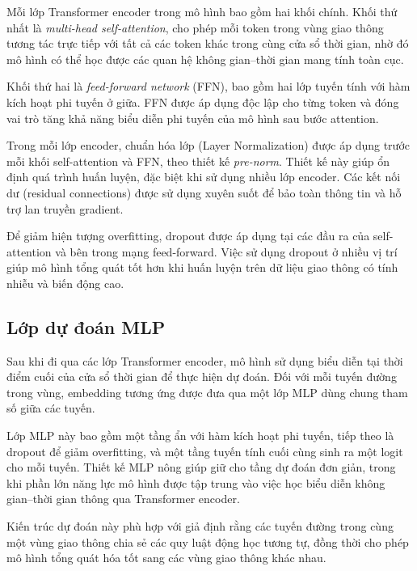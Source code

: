 Mỗi lớp Transformer encoder trong mô hình bao gồm hai khối chính. Khối thứ nhất là
\textit{multi-head self-attention}, cho phép mỗi token trong vùng giao thông tương tác trực
tiếp với tất cả các token khác trong cùng cửa sổ thời gian, nhờ đó mô hình có thể học được
các quan hệ không gian--thời gian mang tính toàn cục.

Khối thứ hai là \textit{feed-forward network} (FFN), bao gồm hai lớp tuyến tính với hàm kích
hoạt phi tuyến ở giữa. FFN được áp dụng độc lập cho từng token và đóng vai trò tăng khả năng
biểu diễn phi tuyến của mô hình sau bước attention.

Trong mỗi lớp encoder, chuẩn hóa lớp (Layer Normalization) được áp dụng trước mỗi khối
self-attention và FFN, theo thiết kế \textit{pre-norm}. Thiết kế này giúp ổn định quá trình
huấn luyện, đặc biệt khi sử dụng nhiều lớp encoder. Các kết nối dư (residual connections)
được sử dụng xuyên suốt để bảo toàn thông tin và hỗ trợ lan truyền gradient.

Để giảm hiện tượng overfitting, dropout được áp dụng tại các đầu ra của self-attention và
bên trong mạng feed-forward. Việc sử dụng dropout ở nhiều vị trí giúp mô hình tổng quát
tốt hơn khi huấn luyện trên dữ liệu giao thông có tính nhiễu và biến động cao.

\subsection{Lớp dự đoán MLP}
\label{subsec:mlp_head}

Sau khi đi qua các lớp Transformer encoder, mô hình sử dụng biểu diễn tại thời điểm cuối
của cửa sổ thời gian để thực hiện dự đoán. Đối với mỗi tuyến đường trong vùng, embedding
tương ứng được đưa qua một lớp MLP dùng chung tham số giữa các tuyến.

Lớp MLP này bao gồm một tầng ẩn với hàm kích hoạt phi tuyến, tiếp theo là dropout để
giảm overfitting, và một tầng tuyến tính cuối cùng sinh ra một logit cho mỗi tuyến.
Thiết kế MLP nông giúp giữ cho tầng dự đoán đơn giản, trong khi phần lớn năng lực mô hình
được tập trung vào việc học biểu diễn không gian--thời gian thông qua Transformer encoder.

Kiến trúc dự đoán này phù hợp với giả định rằng các tuyến đường trong cùng một vùng giao
thông chia sẻ các quy luật động học tương tự, đồng thời cho phép mô hình tổng quát hóa tốt
sang các vùng giao thông khác nhau.
